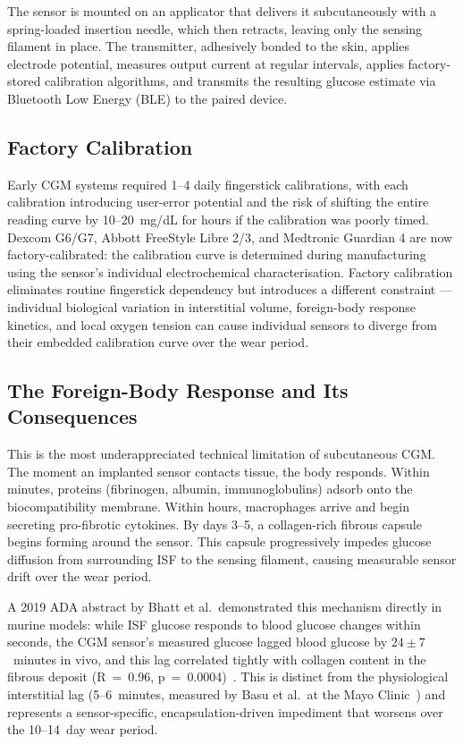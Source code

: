 The sensor is mounted on an applicator that delivers it subcutaneously with a spring-loaded insertion needle, which then retracts, leaving only the sensing filament in place. The transmitter, adhesively bonded to the skin, applies electrode potential, measures output current at regular intervals, applies factory-stored calibration algorithms, and transmits the resulting glucose estimate via Bluetooth Low Energy (BLE) to the paired device.

\subsection*{Factory Calibration}

Early CGM systems required 1--4 daily fingerstick calibrations, with each calibration introducing user-error potential and the risk of shifting the entire reading curve by 10--20~mg/dL for hours if the calibration was poorly timed. Dexcom G6/G7, Abbott FreeStyle Libre 2/3, and Medtronic Guardian 4 are now factory-calibrated: the calibration curve is determined during manufacturing using the sensor's individual electrochemical characterisation. Factory calibration eliminates routine fingerstick dependency but introduces a different constraint --- individual biological variation in interstitial volume, foreign-body response kinetics, and local oxygen tension can cause individual sensors to diverge from their embedded calibration curve over the wear period.

\subsection*{The Foreign-Body Response and Its Consequences}

This is the most underappreciated technical limitation of subcutaneous CGM. The moment an implanted sensor contacts tissue, the body responds. Within minutes, proteins (fibrinogen, albumin, immunoglobulins) adsorb onto the biocompatibility membrane. Within hours, macrophages arrive and begin secreting pro-fibrotic cytokines. By days 3--5, a collagen-rich fibrous capsule begins forming around the sensor. This capsule progressively impedes glucose diffusion from surrounding ISF to the sensing filament, causing measurable sensor drift over the wear period.

A 2019 ADA abstract by Bhatt et al.\ demonstrated this mechanism directly in murine models: while ISF glucose responds to blood glucose changes within seconds, the CGM sensor's measured glucose lagged blood glucose by $24 \pm 7$~minutes in vivo, and this lag correlated tightly with collagen content in the fibrous deposit (R~=~0.96, p~=~0.0004)~\cite{bhatt2019lag}. This is distinct from the physiological interstitial lag (5--6~minutes, measured by Basu et al.\ at the Mayo Clinic~\cite{basu2013lag}) and represents a sensor-specific, encapsulation-driven impediment that worsens over the 10--14~day wear period.

